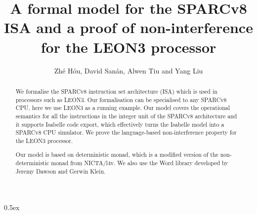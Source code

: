 \documentclass[11pt,a4paper]{article}
\begin{document}
\title{A formal model for the SPARCv8 ISA and a proof of non-interference for the LEON3 processor}
\author{Zh\'e H\'ou, David San\'an, Alwen Tiu and Yang Liu}
\maketitle

\begin{abstract}
We formalise the SPARCv8 instruction set architecture (ISA) which is
used in processors such as LEON3. Our formalisation can be specialised
to any SPARCv8 CPU, here we use LEON3 as a running example. Our model
covers the operational semantics for all the instructions in the
integer unit of the SPARCv8 architecture and it supports Isabelle code
export, which effectively turns the Isabelle model into a SPARCv8 CPU
simulator. We prove the language-based non-interference property for
the LEON3 processor.

Our model is based on deterministic monad, which is a modified version
of the non-deterministic monad from NICTA/l4v. We also use the Word
library developed by Jeremy Dawson and Gerwin Klein.
\end{abstract}

\tableofcontents

\parindent 0pt\parskip 0.5ex



%
%
\end{document}
